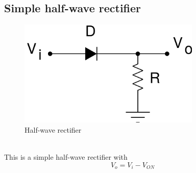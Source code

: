 \documentclass[12pt]{article}
\begin{document}
\subsection{Simple half-wave rectifier}
        \begin{figure}[H]
            \centering
            \includegraphics[width = 0.5\linewidth, height = 2in]{reports/lab3/half.png}
            \caption{Half-wave rectifier}
        \end{figure}
        \\
        This is a simple half-wave rectifier with 
        \begin{equation}
         V_o = V_i - V_{ON}   
        \end{equation}
    
\end{document}
